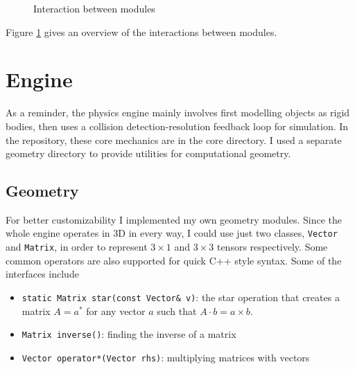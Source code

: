 \documentclass[12pt,a4paper,twoside,openright]{report}
\newcommand{\code}{\texttt}
\begin{document}
\begin{figure}\label{interactionmodlbl}
    \centering
{}
\caption{Interaction between modules}
\end{figure}

Figure \ref{interactionmodlbl} gives an overview of the interactions between modules.

\section{Engine}\label{englbl}

As a reminder, the physics engine mainly involves first modelling objects as rigid bodies, then uses a collision detection-resolution feedback loop for simulation. In the repository, these core mechanics are in the core directory. I used a separate geometry directory to provide utilities for computational geometry.

\subsection{Geometry}

For better customizability I implemented my own geometry modules. Since the whole engine operates in 3D in every way, I could use just two classes, \code{Vector} and \code{Matrix}, in order to represent $3 \times 1$ and $3 \times 3$ tensors respectively. Some common operators are also supported for quick C++ style syntax. Some of the interfaces include

\begin{itemize}
\item \code{static Matrix star(const Vector\& v)}: the star operation that creates a matrix $A=a^*$ for any vector $a$ such that $A \cdot b = a\times b$.
\item \code{Matrix inverse()}: finding the inverse of a matrix
\item \code{Vector operator*(Vector rhs)}: multiplying matrices with vectors
\end{itemize}
\end{document}
